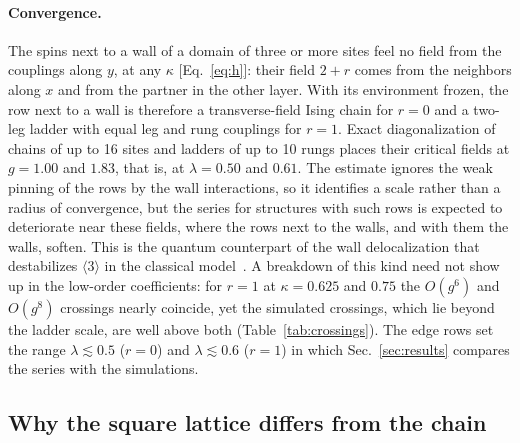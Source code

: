 \documentclass[
 aps,prb,
 twocolumn,
 superscriptaddress,
 longbibliography,
 nofootinbib,
 floatfix
]{revtex4-2}
\begin{document}
\paragraph*{Convergence.}
The spins next to a wall of a domain of three or more sites feel no field from the couplings along $y$, at
any $\kappa$ [Eq.~\eqref{eq:h}]: their field $2+r$ comes from the neighbors along $x$ and from the partner in
the other layer. With its environment frozen, the row next to a wall is therefore a transverse-field Ising
chain for $r=0$ and a two-leg ladder with equal leg and rung couplings for $r=1$. Exact diagonalization of
chains of up to 16 sites and ladders of up to 10 rungs places their critical fields at $g=1.00$ and $1.83$, that is, at
$\lambda=0.50$ and $0.61$. The estimate ignores the weak pinning of the rows by the wall
interactions, so it identifies a scale rather than a radius of convergence, but the series for structures with
such rows is expected to deteriorate near these fields, where the rows next to the walls, and with them the walls,
soften. This is the quantum counterpart of the wall delocalization that destabilizes $\langle3\rangle$ in the
classical model~\cite{selke1988annni}. A breakdown of this kind need not show up in the low-order coefficients:
for $r=1$ at $\kappa=0.625$ and $0.75$ the $O(g^6)$ and $O(g^8)$ crossings nearly coincide, yet the simulated
crossings, which lie beyond the ladder scale, are well above both (Table~\ref{tab:crossings}). The edge rows set the range $\lambda\lesssim0.5$ ($r=0$) and $\lambda\lesssim0.6$ ($r=1$)
in which Sec.~\ref{sec:results} compares the series with the simulations.

\subsection{Why the square lattice differs from the chain}
\label{sec:chain}
\end{document}
